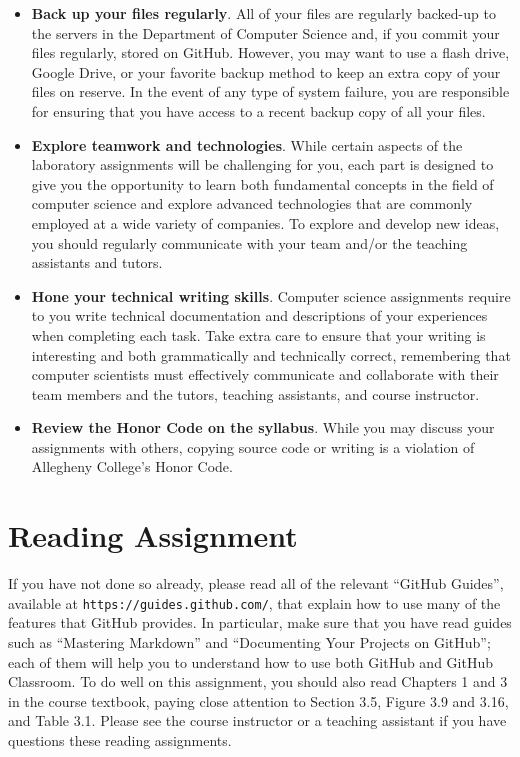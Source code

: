 \documentclass[11pt]{article}
\newcommand{\url}[1]{\lstinline{#1}}
\begin{document}
\begin{itemize}
\item {\bf Back up your files regularly}. All of your files are regularly backed-up to the servers in the Department of
  Computer Science and, if you commit your files regularly, stored on GitHub. However, you may want to use a flash
  drive, Google Drive, or your favorite backup method to keep an extra copy of your files on reserve. In the event of
  any type of system failure, you are responsible for ensuring that you have access to a recent backup copy of all your
  files.

\item {\bf Explore teamwork and technologies}. While certain aspects of the laboratory assignments will be challenging
  for you, each part is designed to give you the opportunity to learn both fundamental concepts in the field of computer
  science and explore advanced technologies that are commonly employed at a wide variety of companies. To explore and
  develop new ideas, you should regularly communicate with your team and/or the teaching assistants and tutors.

\item {\bf Hone your technical writing skills}. Computer science assignments require to you write technical
  documentation and descriptions of your experiences when completing each task. Take extra care to ensure that your
  writing is interesting and both grammatically and technically correct, remembering that computer scientists must
  effectively communicate and collaborate with their team members and the tutors, teaching assistants, and course
  instructor.

\item {\bf Review the Honor Code on the syllabus}. While you may discuss your assignments with others, copying source
  code or writing is a violation of Allegheny College's Honor Code.

\end{itemize}

\section*{Reading Assignment}

If you have not done so already, please read all of the relevant ``GitHub
Guides'', available at \url{https://guides.github.com/}, that explain how to use
many of the features that GitHub provides. In particular, make sure that you
have read guides such as ``Mastering Markdown'' and ``Documenting Your Projects
on GitHub''; each of them will help you to understand how to use both GitHub and
GitHub Classroom. To do well on this assignment, you should also read Chapters 1
and 3 in the course textbook, paying close attention to Section 3.5, Figure 3.9
and 3.16, and Table 3.1. Please see the course instructor or a teaching
assistant if you have questions these reading assignments.
\end{document}
